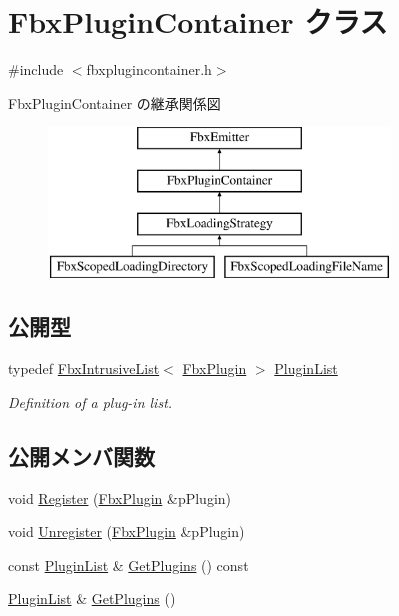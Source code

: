 \hypertarget{class_fbx_plugin_container}{}\section{Fbx\+Plugin\+Container クラス}
\label{class_fbx_plugin_container}


{\ttfamily \#include $<$fbxplugincontainer.\+h$>$}

Fbx\+Plugin\+Container の継承関係図\begin{figure}[H]
\begin{center}
\leavevmode
\includegraphics[height=4.000000cm]{class_fbx_plugin_container}
\end{center}
\end{figure}
\subsection*{公開型}
\begin{DoxyCompactItemize}
\item 
typedef \hyperlink{class_fbx_intrusive_list}{Fbx\+Intrusive\+List}$<$ \hyperlink{class_fbx_plugin}{Fbx\+Plugin} $>$ \hyperlink{class_fbx_plugin_container_a42abd8471efa91f56de2c4c64c220972}{Plugin\+List}
\begin{DoxyCompactList}\small\item\em Definition of a plug-\/in list. \end{DoxyCompactList}\end{DoxyCompactItemize}
\subsection*{公開メンバ関数}
\begin{DoxyCompactItemize}
\item 
void \hyperlink{class_fbx_plugin_container_a3fc28ffe0296973afb3014112b4b0df0}{Register} (\hyperlink{class_fbx_plugin}{Fbx\+Plugin} \&p\+Plugin)
\item 
void \hyperlink{class_fbx_plugin_container_af4b2068d41d0e87e97135e9effea55f7}{Unregister} (\hyperlink{class_fbx_plugin}{Fbx\+Plugin} \&p\+Plugin)
\item 
const \hyperlink{class_fbx_plugin_container_a42abd8471efa91f56de2c4c64c220972}{Plugin\+List} \& \hyperlink{class_fbx_plugin_container_a5fb043debeddd64f7e0f6c34b882b3a9}{Get\+Plugins} () const
\item 
\hyperlink{class_fbx_plugin_container_a42abd8471efa91f56de2c4c64c220972}{Plugin\+List} \& \hyperlink{class_fbx_plugin_container_a7afab0ebbb775ef23ea541bec3adc301}{Get\+Plugins} ()
\end{DoxyCompactItemize}
